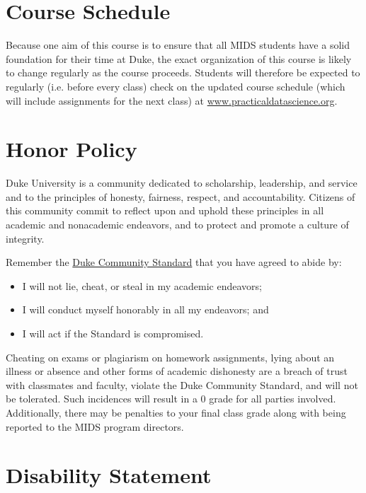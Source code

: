 \documentclass[12pt]{article}
\begin{document}
\section{Course Schedule}

Because one aim of this course is to ensure that all MIDS students have a solid foundation for their time at Duke, the exact organization of this course is likely to change regularly as the course proceeds. Students will therefore be expected to regularly (i.e. before every class) check on the updated course schedule (which will include assignments for the next class) at \href{https://www.practicaldatascience.org}{www.practicaldatascience.org}.


\section{Honor Policy}

Duke University is a community dedicated to scholarship, leadership, and service and to the principles of honesty, fairness, respect, and accountability. Citizens of this community commit to reflect upon and uphold these principles in all academic and nonacademic endeavors, and to protect and promote a culture of integrity.

Remember the \href{https://studentaffairs.duke.edu/conduct/about-us/duke-community-standard}{Duke Community Standard} that you have agreed to abide by:

\begin{itemize}
	\item I will not lie, cheat, or steal in my academic endeavors;
	\item I will conduct myself honorably in all my endeavors; and
	\item I will act if the Standard is compromised.
\end{itemize}

Cheating on exams or plagiarism on homework assignments, lying about an illness or absence and other forms of academic dishonesty are a breach of trust with classmates and faculty, violate the Duke Community Standard, and will not be tolerated. Such incidences will result in a 0 grade for all parties involved. Additionally, there may be penalties to your final class grade along with being reported to the MIDS program directors.

\section{Disability Statement}
\end{document}
